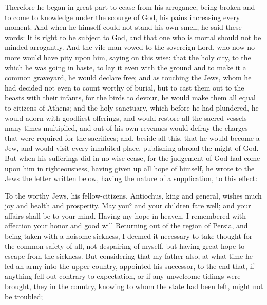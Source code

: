 {Therefore he began in great part to cease from his arrogance, being broken
{} and to come to knowledge under the scourge of God, his pains increasing every moment.
And when he himself could not stand his own smell, he said these words: It is right to be subject to God, and that one who is mortal should not
 be minded arrogantly.
And the vile man vowed to the sovereign Lord, who now no more would have pity upon him, saying on this wise:
that the holy city, to the which he was going in haste, to lay it even with the ground and to
 make it a common graveyard, he would declare free;
and as touching the Jews, whom he had decided not even to count worthy of burial, but to cast them out to the beasts with their infants, for the birds to devour, he would make them all equal to citizens of Athens;
and the holy sanctuary, which before he had plundered, he would adorn with goodliest offerings, and would restore all the sacred vessels many times multiplied, and out of his own revenues would defray the charges that were required for the sacrifices;
and, beside all this, that he would become a Jew, and would visit every inhabited place, publishing abroad the might of God.
But when his sufferings did in no wise cease, for the judgement of God had come upon him in righteousness, having given up all hope of himself, he wrote to the Jews the letter written below, having the nature of a supplication, to this effect:
\par }{\PP {}To the worthy Jews, his fellow-citizens, Antiochus, king and general, wishes much joy and health and prosperity.
 May you° and your children fare well; and your affairs shall be to your mind. Having my hope in heaven,
I remembered with affection your honor and good will
{} Returning out of the region of Persia, and being taken with a noisome sickness, I deemed it necessary to take thought for the common safety of all,
not despairing of myself, but having great hope to escape from the sickness.
But considering that my father also, at what time he led an army into the upper country, appointed his successor,
to the end that, if anything fell out contrary to expectation, or if any unwelcome tidings were brought, they
{} in the country, knowing to whom the state had been left, might not be troubled;
}
